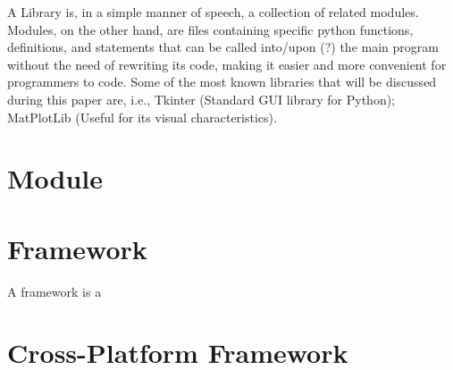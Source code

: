 
A Library is, in a simple manner of speech, a collection of related modules.
Modules, on the other hand, are files containing specific python functions, definitions, and statements that can be called into/upon (?) the main program without the need of rewriting its code, making it easier and more convenient for programmers to code.
Some of the most known libraries that will be discussed during this paper are, i.e., Tkinter (Standard GUI library for Python); MatPlotLib (Useful for its visual characteristics). 

\section{Module} 
\label{sub:module}

\section{Framework} 
\label{sub:framework}

A framework is a 





\section{Cross-Platform Framework} 
\label{sub:cp_framework}

